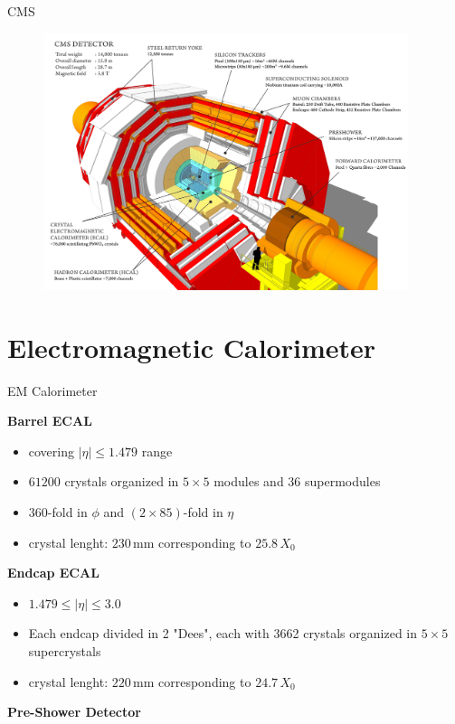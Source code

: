 \documentclass[10pt]{beamer}
\begin{document}
\begin{frame}[fragile]{CMS}
  \begin{figure}
        \centering
        \includegraphics[width=0.95\textwidth]{./img/CMS_scheme.png}
    \end{figure}
\end{frame}


\section{Electromagnetic Calorimeter}

\begin{frame}[fragile]{EM Calorimeter}

    \textbf{Barrel ECAL}
    \begin{itemize}
        \item  covering $|\eta| \leq 1.479 $ range
        \item $61200$ crystals organized in $5\times5$ modules and $36$ supermodules
        \item $360$-fold in $\phi$ and $(2\times85)$-fold in $\eta$
        \item crystal lenght: $230$\,mm corresponding to $25.8\,X_0$ 
    \end{itemize}
    \textbf{Endcap ECAL} 
    \begin{itemize}
        \item $1.479 \leq |\eta| \leq 3.0 $
        \item Each endcap divided in 2 "Dees", each with 3662 crystals organized in $5\times5$ supercrystals
        \item crystal lenght: $220$\,mm corresponding to $24.7\,X_0$ 
    \end{itemize}
    \textbf{Pre-Shower Detector}
\end{frame}
\end{document}
